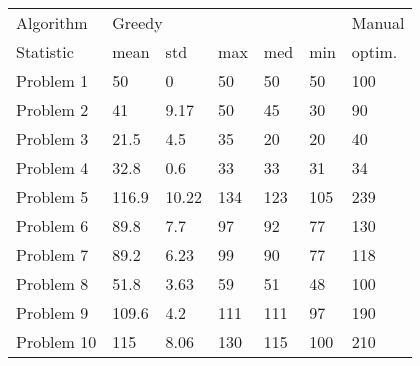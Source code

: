 \begin{tabular}{lllllll}
\toprule
Algorithm & \multicolumn{5}{l}{Greedy} & Manual \\
Statistic &   mean &    std &  max &  med &  min & optim. \\
\midrule
Problem 1  &     50 &      0 &   50 &   50 &   50 &    100 \\
Problem 2  &     41 &   9.17 &   50 &   45 &   30 &     90 \\
Problem 3  &   21.5 &    4.5 &   35 &   20 &   20 &     40 \\
Problem 4  &   32.8 &    0.6 &   33 &   33 &   31 &     34 \\
Problem 5  &  116.9 &  10.22 &  134 &  123 &  105 &    239 \\
Problem 6  &   89.8 &    7.7 &   97 &   92 &   77 &    130 \\
Problem 7  &   89.2 &   6.23 &   99 &   90 &   77 &    118 \\
Problem 8  &   51.8 &   3.63 &   59 &   51 &   48 &    100 \\
Problem 9  &  109.6 &    4.2 &  111 &  111 &   97 &    190 \\
Problem 10 &    115 &   8.06 &  130 &  115 &  100 &    210 \\
\bottomrule
\end{tabular}
